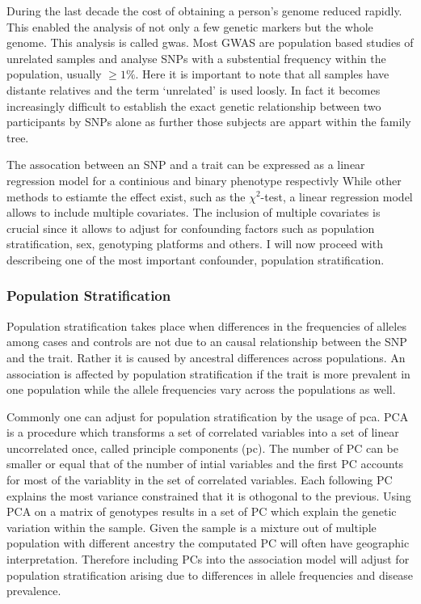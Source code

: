 During the last decade the cost of obtaining a person's genome reduced rapidly.
This enabled the analysis of not only a few genetic markers but the whole genome.
This analysis is called \acrfull{gwas}.
Most GWAS are population based studies of unrelated samples and analyse SNPs with a substential frequency within the population, usually $\ge 1\%$.
Here it is important to note that all samples have distante relatives and the term `unrelated' is used loosly.
In fact it becomes increasingly difficult to establish the exact genetic relationship between two participants by SNPs alone as further those subjects are appart within the family tree.

The assocation between an SNP and a trait can be expressed as a linear regression model for a continious and binary phenotype respectivly
While other methods to estiamte the effect exist, such as the $\chi^2$-test, a linear regression model allows to include multiple covariates.
The inclusion of multiple covariates is crucial since it allows to adjust for confounding factors such as population stratification, sex, genotyping platforms and others.
I will now proceed with describeing one of the most important confounder, population stratification.

\subsubsection{Population Stratification}
\label{ssub:population_stratification}
Population stratification takes place when differences in the frequencies of alleles among cases and controls are not due to an causal relationship between the SNP and the trait.
Rather it is caused by ancestral differences across populations.
An association is affected by population stratification if the trait is more prevalent in one population while the allele frequencies vary across the populations as well.

Commonly one can adjust for population stratification by the usage of \acrfull{pca}.
PCA is a procedure which transforms a set of correlated variables into a set of linear uncorrelated once, called principle components (\acrshort{pc}).
The number of PC can be smaller or equal that of the number of intial variables and the first PC accounts for most of the variablity in the set of correlated variables.
Each following PC explains the most variance constrained that it is othogonal to the previous.
Using PCA on a matrix of genotypes results in a set of PC which explain the genetic variation within the sample.
Given the sample is a mixture out of multiple population with different ancestry the computated PC will often have geographic interpretation.
Therefore including PCs into the association model will adjust for population stratification arising due to differences in allele frequencies and disease prevalence.


